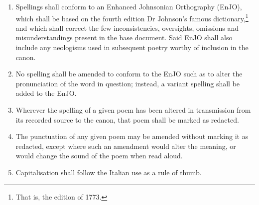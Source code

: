 \begin{enumerate}[leftmargin=*, resume]
    \item{Spellings shall conform to an Enhanced Johnsonian Orthography (EnJO), which shall be based on the fourth edition Dr Johnson's famous dictionary,\footnote{That is, the edition of 1773.} and which shall correct the few inconsistencies, oversights, omissions and misunderstandings present in the base document. Said EnJO shall also include any neologisms used in subsequent poetry worthy of inclusion in the canon.}
    \item{No spelling shall be amended to conform to the EnJO such as to alter the pronunciation of the word in question; instead, a variant spelling shall be added to the EnJO.}
    \item{Wherever the spelling of a given poem has been altered in transmission from its recorded source to the canon, that poem shall be marked as redacted.}
    \item{The punctuation of any given poem may be amended without marking it as redacted, except where such an amendment would alter the meaning, or would change the sound of the poem when read aloud.}
    \item{Capitalisation shall follow the Italian use as a rule of thumb.}
\end{enumerate}
